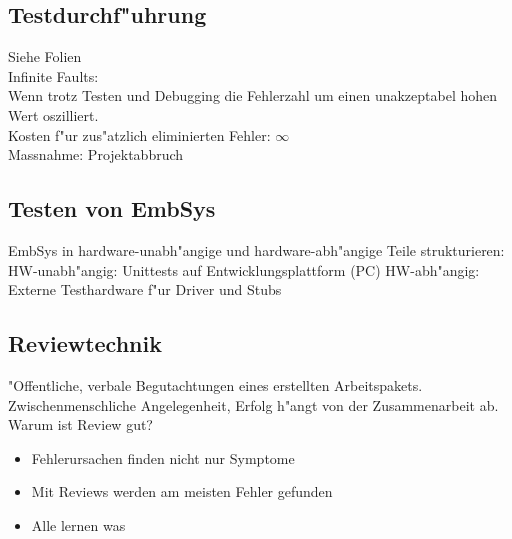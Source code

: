 \subsection{Testdurchf"uhrung}
Siehe Folien\\
Infinite Faults:\\
Wenn trotz Testen und Debugging die Fehlerzahl um einen unakzeptabel hohen Wert oszilliert.\\
Kosten f"ur zus"atzlich eliminierten Fehler: $\infty$\\
Massnahme: Projektabbruch

\subsection{Testen von EmbSys}
EmbSys in hardware-unabh"angige und hardware-abh"angige Teile strukturieren:\\
HW-unabh"angig: Unittests auf Entwicklungsplattform (PC)
HW-abh"angig: Externe Testhardware f"ur Driver und Stubs

\subsection{Reviewtechnik}
"Offentliche, verbale Begutachtungen eines erstellten Arbeitspakets. Zwischenmenschliche Angelegenheit, Erfolg h"angt von der Zusammenarbeit ab.
Warum ist Review gut? 
\begin{itemize}
\item Fehlerursachen finden nicht nur Symptome
\item Mit Reviews werden am meisten Fehler gefunden
\item Alle lernen was
\end{itemize}